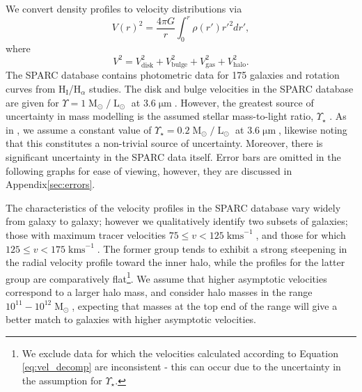 \documentclass{pasa}%
\begin{document}
We convert  density profiles to velocity distributions \cite{Sofue:2008wt} via 
%
\begin{equation}
    V(r)^2 = \frac{4\pi G}{r}\int_0^r \rho(r')r'^2 dr',
\end{equation}
where 
\begin{equation}\label{eq:vel_decomp}
    V^2 = V_{\mathrm{disk}}^2 + V_{\mathrm{bulge}}^2 + V_{\mathrm{gas}}^2 + V_{\mathrm{halo}}^2.
\end{equation}
%
The SPARC database contains photometric data for 175 galaxies and rotation curves from $\mathrm{H}_{\mathrm{I}}$/$\mathrm{H}_{\alpha}$ studies. The disk and bulge velocities in the SPARC database are given for $\Upsilon = 1 \operatorname{M}_{\odot}/\operatorname{L}_{\odot}$ at $3.6\operatorname{\mu m}$. However, the greatest source of uncertainty in mass modelling is the assumed stellar mass-to-light ratio, $\Upsilon_\star$ \cite{Lelli:2016zqa}. As in \cite{Robles:2018fur}, we  assume a constant value of $\Upsilon_\star = 0.2 \operatorname{M}_{\odot}/\operatorname{L}_{\odot}$ at $3.6\operatorname{\mu m}$, likewise noting that  this constitutes a non-trivial source of uncertainty. Moreover, there is significant uncertainty in the SPARC data itself. Error bars are omitted in the following graphs for ease of viewing, however, they are discussed in Appendix\ref{sec:errors}. 

The characteristics of the velocity profiles in the SPARC database vary widely from galaxy to galaxy; however we qualitatively identify two subsets of galaxies; those with maximum tracer velocities $75 \leq v < 125\operatorname{kms}^{-1}$, and those for which $125 \leq v < 175\operatorname{kms}^{-1}$. The former group tends to exhibit a strong steepening in the radial velocity profile toward the inner halo, while the  profiles for the latter group are comparatively flat\footnote{We exclude data for which the velocities calculated according to Equation \ref{eq:vel_decomp} are inconsistent - this can occur due to the uncertainty in the assumption for $\Upsilon_\star$.}. We assume that higher asymptotic velocities correspond to a larger halo mass, and consider halo masses in the range $10^{11} - 10^{12} \operatorname{M}_{\odot}$, expecting that masses at the top end of the range will give a better match to galaxies with higher asymptotic velocities. 
\end{document}
